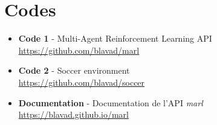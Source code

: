 
\chapter*{Codes}
\begin{itemize}
\item \label{code:marl} \textbf{Code 1} - Multi-Agent Reinforcement Learning API \\
\url{https://github.com/blavad/marl}
\item \label{code:soccer} \textbf{Code 2} -  Soccer environment\\
\url{https://github.com/blavad/soccer}
\item \label{code:doc} \textbf{Documentation} -  Documentation de l'API \textit{marl}\\
\url{https://blavad.github.io/marl}

\end{itemize}